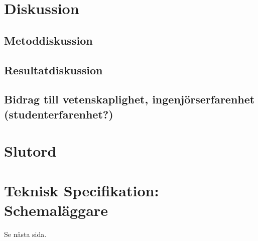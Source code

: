 \documentclass[conference,a4paper]{IEEEtran}
\begin{document}
\section{Diskussion} \label{sec:disk}

\subsection{Metoddiskussion}

\subsection{Resultatdiskussion}

\subsection{Bidrag till vetenskaplighet, ingenjörserfarenhet (studenterfarenhet?)}

\section{Slutord} \label{sec:slutord}



%
%
%







\appendices
\section{Teknisk Specifikation: Schemaläggare}
Se nästa sida.
\newpage
\null%
\newpage


\end{document}
